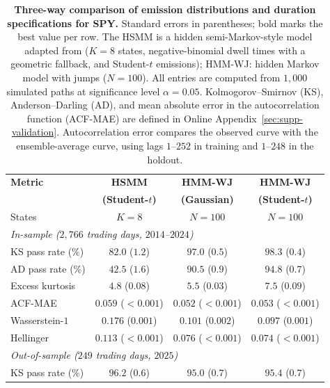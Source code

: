 \begin{table}[tbp]
\centering
\caption{\textbf{Three-way comparison of emission distributions and
    duration specifications for SPY.} Standard
    errors in parentheses; bold marks the best value per row. The HSMM
    is a hidden semi-Markov-style model adapted from \citet{bullaBulla2006}
    ($K = 8$ states, negative-binomial dwell times with a geometric
    fallback, and Student-$t$ emissions); HMM-WJ:
    hidden Markov model with jumps
    ($N = 100$). All entries are computed from $1{,}000$ simulated
    paths at significance level $\alpha = 0.05$. Kolmogorov--Smirnov
    (KS), Anderson--Darling (AD), and mean absolute error in the
    autocorrelation function (ACF-MAE) are defined in
    Online Appendix~\ref{sec:supp-validation}. Autocorrelation error
    compares the observed curve with the ensemble-average curve,
    using lags $1$--$252$ in training and $1$--$248$ in the holdout.}
\label{tab:emission_hsmm}
\small
\begin{tabular}{@{}lccc@{}}
\toprule
\textbf{Metric} & \textbf{HSMM} & \textbf{HMM-WJ} & \textbf{HMM-WJ} \\
                & \textbf{(Student-$t$)} & \textbf{(Gaussian)} & \textbf{(Student-$t$)} \\ \midrule
States              & $K = 8$ & $N = 100$ & $N = 100$ \\[4pt]
\multicolumn{4}{l}{\textit{In-sample ($2{,}766$ trading days, $2014$--$2024$)}} \\[2pt]
KS pass rate (\%)   &  $82.0$ ($1.2$)         &  $97.0$ ($0.5$)         & $\mathbf{98.3}$ ($0.4$) \\
AD pass rate (\%)   &  $42.5$ ($1.6$)         &  $90.5$ ($0.9$)         & $\mathbf{94.8}$ ($0.7$) \\
Excess kurtosis     &   $4.8$ ($0.08$)        &   $5.5$ ($0.03$)        & $\mathbf{7.5}$ ($0.09$) \\
ACF-MAE             & $0.059$ ($<\!0.001$)    & $\mathbf{0.052}$ ($<\!0.001$) & $0.053$ ($<\!0.001$) \\
Wasserstein-$1$     & $0.176$ ($0.001$)       & $0.101$ ($0.002$)       & $\mathbf{0.097}$ ($0.001$) \\
Hellinger           & $0.113$ ($<\!0.001$)    & $0.076$ ($<\!0.001$)   & $\mathbf{0.074}$ ($<\!0.001$) \\[4pt]
\multicolumn{4}{l}{\textit{Out-of-sample ($249$ trading days, $2025$)}} \\[2pt]
KS pass rate (\%)   & $\mathbf{96.2}$ ($0.6$) &  $95.0$ ($0.7$)         &  $95.4$ ($0.7$) \\

\end{tabular}
\end{table}
